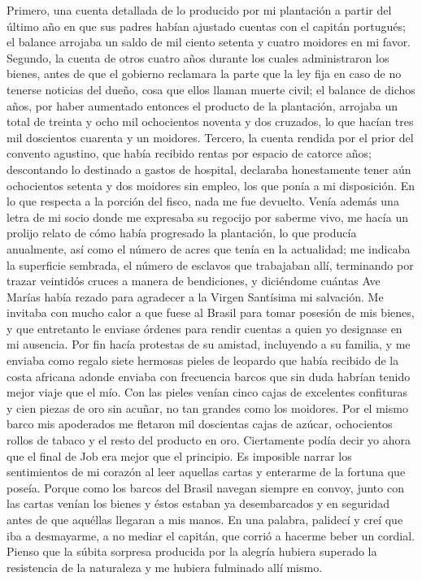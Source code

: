 \documentclass{novela}
\begin{document}
    Primero, una cuenta detallada de lo producido por mi plantación a partir del último año en que sus padres habían ajustado cuentas con el capitán portugués; el balance arrojaba un saldo de mil ciento setenta y cuatro moidores en mi favor.
    Segundo, la cuenta de otros cuatro años durante los cuales administraron los bienes, antes de que el gobierno reclamara la parte que la ley fija en caso de no tenerse noticias del dueño, cosa que ellos llaman muerte civil; el balance de dichos años, por haber aumentado entonces el producto de la plantación, arrojaba un total de treinta y ocho mil ochocientos noventa y dos cruzados, lo que hacían tres mil doscientos cuarenta y un moidores.
    Tercero, la cuenta rendida por el prior del convento agustino, que había recibido rentas por espacio de catorce años; descontando lo destinado a gastos de hospital, declaraba honestamente tener aún ochocientos setenta y dos moidores sin empleo, los que ponía a mi disposición. En lo que respecta a la porción del fisco, nada me fue devuelto.
    Venía además una letra de mi socio donde me expresaba su regocijo por saberme vivo, me hacía un prolijo relato de cómo había progresado la plantación, lo que producía anualmente, así como el número de acres que tenía en la actualidad; me indicaba la superficie sembrada, el número de esclavos que trabajaban allí, terminando por trazar veintidós cruces a manera de bendiciones, y diciéndome cuántas Ave Marías había rezado para agradecer a la Virgen Santísima mi salvación. Me invitaba con mucho calor a que fuese al Brasil para tomar posesión de mis bienes, y que entretanto le enviase órdenes para rendir cuentas a quien yo designase en mi ausencia. Por fin hacía protestas de su amistad, incluyendo a su familia, y me enviaba como regalo siete hermosas pieles de leopardo que había recibido de la costa africana adonde enviaba con frecuencia barcos que sin duda habrían tenido mejor viaje que el mío. Con las pieles venían cinco cajas de excelentes confituras y cien piezas de oro sin acuñar, no tan grandes como los moidores. Por el mismo barco mis apoderados me fletaron mil doscientas cajas de azúcar, ochocientos rollos de tabaco y el resto del producto en oro.
    Ciertamente podía decir yo ahora que el final de Job era mejor que el principio. Es imposible narrar los sentimientos de mi corazón al leer aquellas cartas y enterarme de la fortuna que poseía. Porque como los barcos del Brasil navegan siempre en convoy, junto con las cartas venían los bienes y éstos estaban ya desembarcados y en seguridad antes de que aquéllas llegaran a mis manos.
    En una palabra, palidecí y creí que iba a desmayarme, a no mediar el capitán, que corrió a hacerme beber un cordial. Pienso que la súbita sorpresa producida por la alegría hubiera superado la resistencia de la naturaleza y me hubiera fulminado allí mismo.
\end{document}
